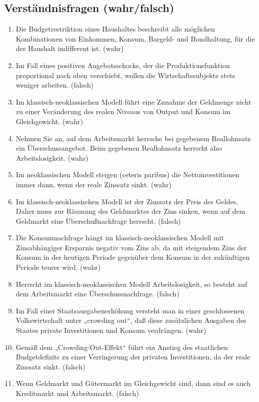 \documentclass{scrartcl}
\begin{document}
\subsection{Verständnisfragen (wahr/falsch)}
\begin{enumerate}
	\item Die Budgetrestriktion eines Haushaltes beschreibt alle möglichen Kombinationen von Einkommen, Konsum, Bargeld- und Bondhaltung, für die der Haushalt indifferent ist. (wahr)
	\item Im Fall eines positiven Angebotsschocks, der die Produktionsfunktion proportional nach oben verschiebt, wollen die Wirtschaftssubjekte stets weniger arbeiten. (falsch)
	\item Im klassisch-neoklassischen Modell führt eine Zunahme der Geldmenge nicht zu einer Veränderung des realen Niveaus von Output und Konsum im Gleichgewicht. (wahr)
	\item Nehmen Sie an, auf dem Arbeitsmarkt herrsche bei gegebenem Reallohnsatz ein Überschussangebot. Beim gegebenen Reallohnsatz herrscht also Arbeitslosigkeit. (wahr)
	\item Im neoklassischen Modell steigen (ceteris paribus) die Nettoinvestitionen immer dann, wenn der reale Zinssatz sinkt. (wahr)
	\item Im klassisch-neoklassischen Modell ist der Zinssatz der Preis des Geldes. Daher muss zur Räumung des Geldmarktes der Zins sinken, wenn auf dem Geldmarkt eine Überschußnachfrage herrscht. (falsch)
	\item Die Konsumnachfrage hängt im klassisch-neoklassischen Modell mit Zinsabhängiger Ersparnis negativ vom Zins ab, da mit steigendem Zins der Konsum in der heutigen Periode gegenüber dem Konsum in der zukünftigen Periode teurer wird. (wahr)
	\item Herrscht im klassisch-neoklassischen Modell Arbeitslosigkeit, so besteht auf dem Arbeitsmarkt eine Überschussnachfrage. (falsch)
	\item Im Fall einer Staatsausgabenerhöhung versteht man in einer geschlossenen Volkswirtschaft unter „crowding out“, daß diese zusätzlichen Ausgaben des Staates private Investitionen und Konsum verdrängen. (wahr)
	\item Gemäß dem „Crowding-Out-Effekt“ führt ein Anstieg des staatlichen Budgetdefizits zu einer Verringerung der privaten Investitionen, da der reale Zinssatz sinkt. (falsch)
	\item Wenn Geldmarkt und Gütermarkt im Gleichgewicht sind, dann sind es auch Kreditmarkt und Arbeitsmarkt. (falsch)

\end{enumerate}
\end{document}
